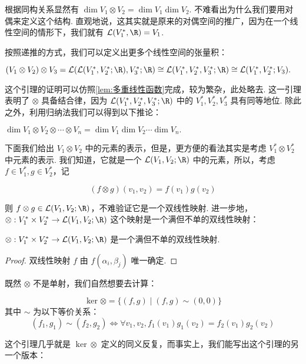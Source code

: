 根据同构关系显然有 $\dim V_1 \otimes V_2 = \dim V_1 \dim V_2$. 不难看出为什么我们要用对偶来定义这个结构. 直观地说，这其实就是原来的对偶空间的推广，因为在一个线性空间的情形下，我们就有 $\mathcal{L}(V_1^*, \R) = V_1$.

按照递推的方式，我们可以定义出更多个线性空间的张量积：
\begin{lemma}{}{}
    $(V_1 \otimes V_2) \otimes V_3 = \mathcal{L}(\mathcal{L}(V_1^*, V_2^*; \R), V_3^*; \R) \cong \mathcal{L}(V_1^*, V_2^*, V_3^*; \R) \cong \mathcal{L}(V_1^*, V_2^*; V_3).$
\end{lemma}

这个引理的证明可以仿照\autoref{lem:多重线性函数}完成，较为繁杂，此处略去. 这一引理表明了 $\otimes$ 具备结合律，因为 $\mathcal{L}(V_1^*, V_2^*, V_3^*; \R)$ 中的 $V_1^*, V_2^*, V_3^*$ 具有同等地位. 除此之外，利用归纳法我们可以得到以下推论：
\begin{corollary}{}{}
    $\dim V_1 \otimes V_2 \otimes \cdots \otimes V_n = \dim V_1 \dim V_2 \cdots \dim V_n.$
\end{corollary}

下面我们给出 $V_1 \otimes V_2$ 中的元素的表示，但是，更方便的看法其实是考虑 $V_1^* \otimes V_2^*$ 中元素的表示. 我们知道，它就是一个 $\mathcal{L}(V_1, V_2; \R)$ 中的元素，所以，考虑 $f \in V_1^*, g \in V_2^*$，记

\[
(f \otimes g) (v_1, v_2) = f(v_1) g(v_2)
\]

则 $f \otimes g \in \mathcal{L}(V_1, V_2; \R)$，不难验证它是一个双线性映射. 进一步地，$\otimes: V_1^* \times V_2^* \to \mathcal{L}(V_1, V_2; \R)$ 这个映射是一个满但不单的双线性映射：
\begin{lemma}{}{}
    $\otimes: V_1^* \times V_2^* \to \mathcal{L}(V_1, V_2; \R)$ 是一个满但不单的双线性映射.
\end{lemma}
\begin{proof}
    双线性映射 $f$ 由 $f(\alpha_i,\beta_j)$ 唯一确定.
\end{proof}

既然 $\otimes$ 不是单射，我们自然想要去计算：

\begin{lemma}{}{}
    \[
    \ker \otimes = \{(f, g) \mid (f, g) \sim (0, 0)\}
    \]
    其中 $\sim$ 为以下等价关系：
    \[
    (f_1, g_1) \sim (f_2, g_2) \iff \forall v_1, v_2, f_1(v_1) g_1(v_2) = f_2(v_1) g_2(v_2)
    \]
\end{lemma}

这个引理几乎就是 $\ker \otimes$ 定义的同义反复，而事实上，我们能写出这个引理的另一个版本：

